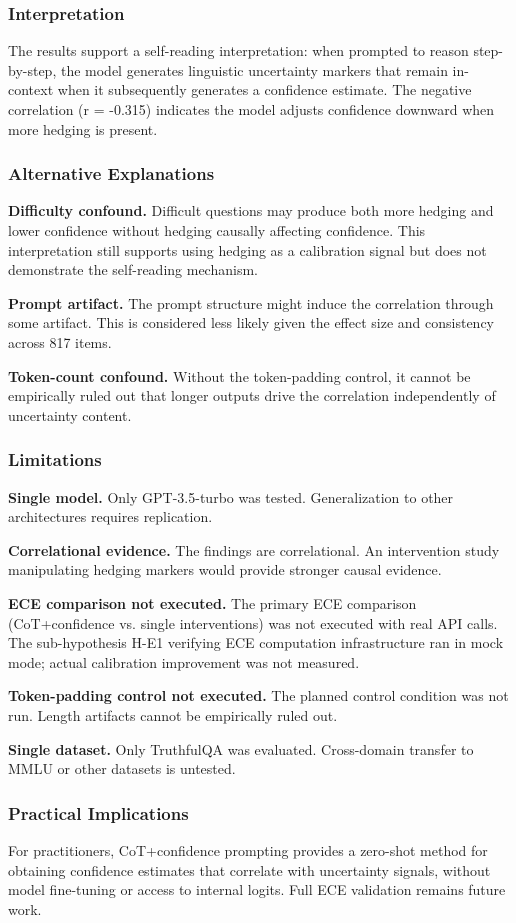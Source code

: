 
\subsubsection{Interpretation}

The results support a self-reading interpretation: when prompted to reason step-by-step, the model generates linguistic uncertainty markers that remain in-context when it subsequently generates a confidence estimate. The negative correlation (r = -0.315) indicates the model adjusts confidence downward when more hedging is present.

\subsubsection{Alternative Explanations}

\textbf{Difficulty confound.} Difficult questions may produce both more hedging and lower confidence without hedging causally affecting confidence. This interpretation still supports using hedging as a calibration signal but does not demonstrate the self-reading mechanism.

\textbf{Prompt artifact.} The prompt structure might induce the correlation through some artifact. This is considered less likely given the effect size and consistency across 817 items.

\textbf{Token-count confound.} Without the token-padding control, it cannot be empirically ruled out that longer outputs drive the correlation independently of uncertainty content.

\subsubsection{Limitations}

\textbf{Single model.} Only GPT-3.5-turbo was tested. Generalization to other architectures requires replication.

\textbf{Correlational evidence.} The findings are correlational. An intervention study manipulating hedging markers would provide stronger causal evidence.

\textbf{ECE comparison not executed.} The primary ECE comparison (CoT+confidence vs. single interventions) was not executed with real API calls. The sub-hypothesis H-E1 verifying ECE computation infrastructure ran in mock mode; actual calibration improvement was not measured.

\textbf{Token-padding control not executed.} The planned control condition was not run. Length artifacts cannot be empirically ruled out.

\textbf{Single dataset.} Only TruthfulQA was evaluated. Cross-domain transfer to MMLU or other datasets is untested.

\subsubsection{Practical Implications}

For practitioners, CoT+confidence prompting provides a zero-shot method for obtaining confidence estimates that correlate with uncertainty signals, without model fine-tuning or access to internal logits. Full ECE validation remains future work.
